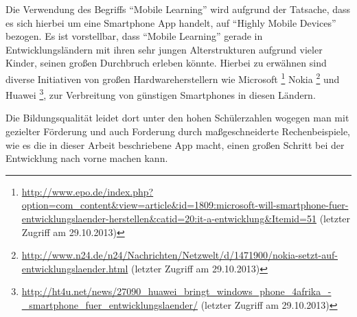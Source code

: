 Die Verwendung des Begriffs \enquote{Mobile Learning} wird aufgrund der Tatsache, dass es sich
hierbei um eine Smartphone App handelt, auf \enquote{Highly Mobile Devices} bezogen.
Es ist vorstellbar, dass \enquote{Mobile Learning} gerade in Entwicklungsländern mit ihren sehr
jungen Alterstrukturen aufgrund vieler Kinder, seinen großen Durchbruch erleben könnte. Hierbei zu
erwähnen sind diverse Initiativen von großen Hardwareherstellern wie Microsoft \footnote{\url{http://www.epo.de/index.php?option=com_content&view=article&id=1809:microsoft-will-smartphone-fuer-entwicklungslaender-herstellen&catid=20:it-a-entwicklung&Itemid=51} (letzter Zugriff am 29.10.2013)}
Nokia \footnote{\url{http://www.n24.de/n24/Nachrichten/Netzwelt/d/1471900/nokia-setzt-auf-entwicklungslaender.html} (letzter Zugriff am 29.10.2013)} und Huawei \footnote{\url{http://ht4u.net/news/27090_huawei_bringt_windows_phone_4afrika_-_smartphone_fuer_entwicklungslaender/} (letzter Zugriff am 29.10.2013)},  
zur Verbreitung von günstigen Smartphones in diesen Ländern.

Die Bildungsqualität leidet dort unter den hohen Schülerzahlen wogegen man mit gezielter Förderung
und auch Forderung durch maßgeschneiderte Rechenbeispiele, wie es die in dieser Arbeit beschriebene
App macht, einen großen Schritt bei der Entwicklung nach vorne machen kann.






